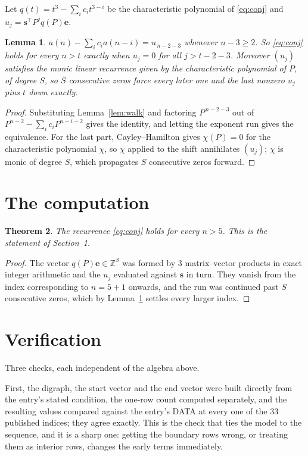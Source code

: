 \documentclass[11pt,a4paper]{article}
\theoremstyle{plain}
\newtheorem{theorem}{Theorem}
\newtheorem{lemma}[theorem]{Lemma}
\theoremstyle{definition}
\begin{document}
Let $q(t)=t^{3}-\sum_i c_i t^{3-i}$ be the characteristic polynomial of
\eqref{eq:conj} and $u_j=\mathbf{s}^{\!\top}P^{j}q(P)\mathbf{e}$.

\begin{lemma}\label{lem:crit}
$a(n)-\sum_i c_i a(n-i)=u_{\,n-2-3}$ whenever $n-3\ge2$. So \eqref{eq:conj}
holds for every $n>t$ exactly when $u_j=0$ for all $j>t-2-3$. Moreover $(u_j)$
satisfies the monic linear recurrence given by the characteristic polynomial of $P$, of
degree $S$, so $S$ consecutive zeros force every later one and the last nonzero $u_j$ pins
$t$ down exactly.
\end{lemma}

\begin{proof}
Substituting Lemma~\ref{lem:walk} and factoring $P^{\,n-2-3}$ out of
$P^{n-2}-\sum_i c_i P^{n-i-2}$ gives the identity, and letting the exponent run gives the
equivalence. For the last part, Cayley--Hamilton gives $\chi(P)=0$ for the characteristic
polynomial $\chi$, so $\chi$ applied to the shift annihilates $(u_j)$; $\chi$ is monic of
degree $S$, which propagates $S$ consecutive zeros forward.
\end{proof}

\section{The computation}

\begin{theorem}
The recurrence \eqref{eq:conj} holds for every $n>5$. This is the statement of
Section~1.
\end{theorem}

\begin{proof}
The vector $q(P)\mathbf{e}\in\mathbb{Z}^{S}$ was formed by $3$ matrix--vector
products in exact integer arithmetic and the $u_j$ evaluated against $\mathbf{s}$ in turn.
They vanish from the index corresponding to $n=5+1$ onwards, and the run was continued
past $S$ consecutive zeros, which by Lemma~\ref{lem:crit} settles every larger index.
\end{proof}

\section{Verification}

Three checks, each independent of the algebra above.

First, the digraph, the start vector and the end vector were built directly from the
entry's stated condition, the one-row count computed separately, and the resulting values
compared against the entry's DATA at every one of the $33$ published indices; they
agree exactly. This is the check that ties the model to the sequence, and it is a sharp one:
getting the boundary rows wrong, or treating them as interior rows, changes the early terms
immediately.
\end{document}
